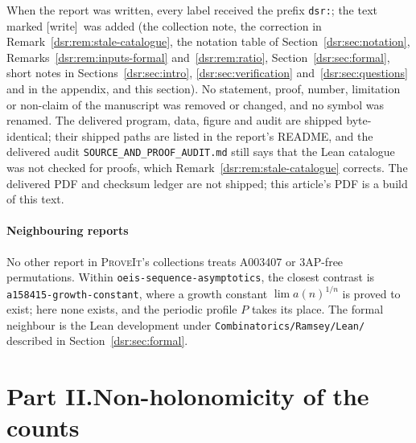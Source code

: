 \documentclass[11pt,a4paper]{article}
\numberwithin{equation}{section}
\theoremstyle{definition}
\theoremstyle{remark}
\newcommand{\repo}{\textsc{ProveIt}}
\newcommand{\wtag}{\textup{[write]}}
\newcommand{\lean}[1]{\nolinkurl{#1}}
\theoremstyle{definition}
\theoremstyle{plain}
\begin{document}
When the report was written, every label received the prefix
\lean{dsr:}; the text marked \wtag\ was added (the collection note, the
correction in Remark~\ref{dsr:rem:stale-catalogue}, the notation table of
Section~\ref{dsr:sec:notation}, Remarks~\ref{dsr:rem:inputs-formal}
and~\ref{dsr:rem:ratio}, Section~\ref{dsr:sec:formal}, short notes in
Sections~\ref{dsr:sec:intro}, \ref{dsr:sec:verification}
and~\ref{dsr:sec:questions} and in the appendix, and this section). No statement, proof, number,
limitation or non-claim of the manuscript was removed or changed, and no
symbol was renamed. The delivered program, data, figure and audit are shipped
byte-identical; their shipped paths are listed in the report's README, and
the delivered audit \lean{SOURCE_AND_PROOF_AUDIT.md} still says that the
Lean catalogue was not checked for proofs, which
Remark~\ref{dsr:rem:stale-catalogue} corrects. The delivered PDF and
checksum ledger are not shipped; this article's PDF is a build of this text.

\subsection{Neighbouring reports}
No other report in \repo's collections treats A003407 or 3AP-free
permutations. Within \lean{oeis-sequence-asymptotics}, the closest contrast is
\lean{a158415-growth-constant}, where a growth constant $\lim a(n)^{1/n}$ is
proved to exist; here none exists, and the periodic profile $P$ takes its
place. The formal neighbour is the Lean development under
\lean{Combinatorics/Ramsey/Lean/} described in
Section~\ref{dsr:sec:formal}.

\clearpage
{}\part*{Part II.\quad Non-holonomicity of the counts}
\end{document}
